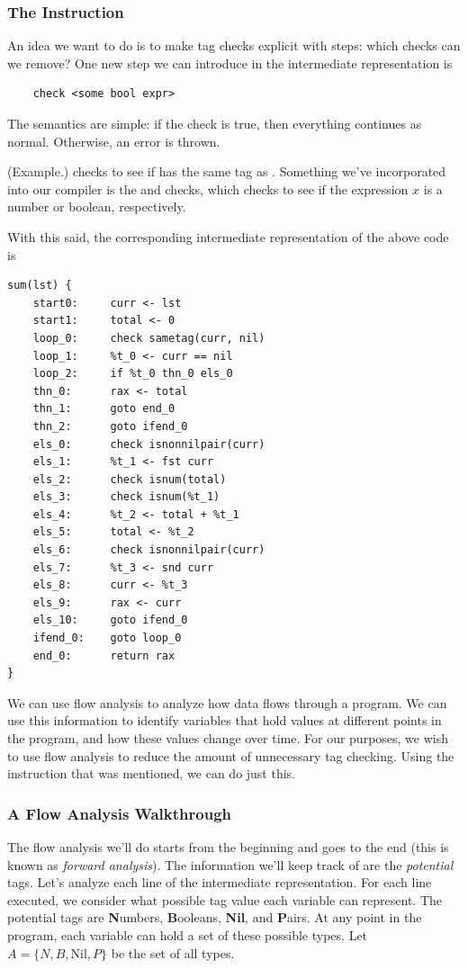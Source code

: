 \subsubsection{The  Instruction}
An idea we want to do is to make tag checks explicit with  steps: which checks can we remove? One new step we can introduce in the intermediate representation is 
\begin{verbatim}
    check <some bool expr>\end{verbatim} 
The semantics are simple: if the check is true, then everything continues as normal. Otherwise, an error is thrown.
\begin{mdframed}
    (Example.)  checks to see if  has the same tag as . Something we've incorporated into our compiler is the  and  checks, which checks to see if the expression $x$ is a number or boolean, respectively.
\end{mdframed}
With this said, the corresponding intermediate representation of the above code is 
\begin{verbatim}
sum(lst) {
    start0:     curr <- lst
    start1:     total <- 0
    loop_0:     check sametag(curr, nil)
    loop_1:     %t_0 <- curr == nil
    loop_2:     if %t_0 thn_0 els_0
    thn_0:      rax <- total
    thn_1:      goto end_0
    thn_2:      goto ifend_0
    els_0:      check isnonnilpair(curr)
    els_1:      %t_1 <- fst curr
    els_2:      check isnum(total)
    els_3:      check isnum(%t_1)
    els_4:      %t_2 <- total + %t_1
    els_5:      total <- %t_2
    els_6:      check isnonnilpair(curr)
    els_7:      %t_3 <- snd curr
    els_8:      curr <- %t_3
    els_9:      rax <- curr
    els_10:     goto ifend_0
    ifend_0:    goto loop_0
    end_0:      return rax
}\end{verbatim}
We can use flow analysis to analyze how data flows through a program. We can use this information to identify variables that hold values at different points in the program, and how these values change over time. For our purposes, we wish to use flow analysis to reduce the amount of unnecessary tag checking. Using the  instruction that was mentioned, we can do just this.

\newpage 
\thispagestyle{noheader}
\subsubsection{A Flow Analysis Walkthrough}
The flow analysis we'll do starts from the beginning and goes to the end (this is known as \emph{forward analysis}). The information we'll keep track of are the \emph{potential} tags. Let's analyze each line of the intermediate representation. For each line executed, we consider what possible tag value each variable can represent. The potential tags are \textbf{N}umbers, \textbf{B}ooleans, \textbf{Nil}, and \textbf{P}airs. At any point in the program, each variable can hold a set of these possible types. Let $A = \{N, B, \text{Nil}, P\}$ be the set of all types.

